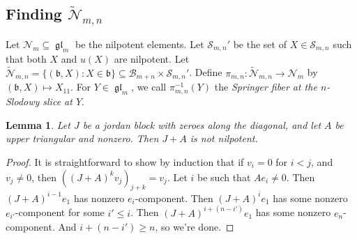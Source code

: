 \documentclass[12pt,psamsfonts]{article}
\DeclareMathOperator{\gl}{\mathfrak{gl}}
\newtheorem{lemma}[theorem]{Lemma}
\begin{document}
\subsection{Finding \(\widetilde{\mathcal{N}}_{m,n}\)}
Let \(\mathcal{N}_m \subseteq \gl_m\) be the nilpotent elements.
Let \(\mathcal{S}_{m,n}'\) be the set of \(X \in \mathcal{S}_{m,n}\) such that both \(X\) and \(u(X)\) are nilpotent.
Let \(\widetilde{\mathcal{N}}_{m,n} = \{(\mathfrak{b}, X) : X \in \mathfrak{b}\} \subseteq \mathcal{B}_{m + n} \times \mathcal{S}_{m,n}'\).
Define \(\pi_{m,n} : \widetilde{\mathcal{N}}_{m,n} \to \mathcal{N}_m\) by \((\mathfrak{b}, X) \mapsto X_{11}\).
For \(Y \in \gl_m\), we call \(\pi_{m,n}^{-1}(Y)\) the \emph{Springer fiber at the \(n\)-Slodowy slice at \(Y\)}.

\begin{lemma}
    Let \(J\) be a jordan block with zeroes along the diagonal, and let \(A\) be upper triangular and nonzero.
    Then \(J + A\) is not nilpotent.
\end{lemma}
\begin{proof}
    It is straightforward to show by induction that if \(v_i = 0\) for \(i < j\), and \(v_j \neq 0\), then \(((J + A)^k v_j)_{j + k} = v_j\).
    Let \(i\) be such that \(Ae_i \neq 0\).
    Then \((J + A)^{i - 1} e_1\) has nonzero \(e_i\)-component.
    Then \((J + A)^i e_1\) has some nonzero \(e_{i'}\)-component for some \(i' \leq i\).
    Then \((J + A)^{i + (n - i')} e_1\) has some nonzero \(e_n\)-component.
    And \(i + (n - i') \geq n\), so we're done.
\end{proof}
\end{document}
